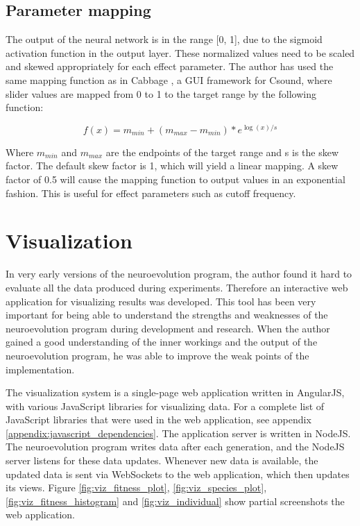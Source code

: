 \subsection{Parameter mapping}
The output of the neural network is in the range [0, 1], due to the sigmoid activation function in the output layer. These normalized values need to be scaled and skewed appropriately for each effect parameter. The author has used the same mapping function as in Cabbage \citep{walsh2008}, a GUI framework for Csound, where slider values are mapped from 0 to 1 to the target range by the following function:

$$f(x)=m_{min}+(m_{max}-m_{min})*e^{\log(x)/s}$$

Where $m_{min}$ and $m_{max}$ are the endpoints of the target range and s is the skew factor. The default skew factor is 1, which will yield a linear mapping. A skew factor of 0.5 will cause the mapping function to output values in an exponential fashion. This is useful for effect parameters such as cutoff frequency.

\section{Visualization}
In very early versions of the neuroevolution program, the author found it hard to evaluate all the data produced during experiments. Therefore an interactive web application for visualizing results was developed. This tool has been very important for being able to understand the strengths and weaknesses of the neuroevolution program during development and research. When the author gained a good understanding of the inner workings and the output of the neuroevolution program, he was able to improve the weak points of the implementation.

The visualization system is a single-page web application written in AngularJS, with various JavaScript libraries for visualizing data. For a complete list of JavaScript libraries that were used in the web application, see appendix \ref{appendix:javascript_dependencies}. The application server is written in NodeJS. The neuroevolution program writes data after each generation, and the NodeJS server listens for these data updates. Whenever new data is available, the updated data is sent via WebSockets to the web application, which then updates its views. Figure \ref{fig:viz_fitness_plot}, \ref{fig:viz_species_plot}, \ref{fig:viz_fitness_histogram} and \ref{fig:viz_individual} show partial screenshots the web application.


